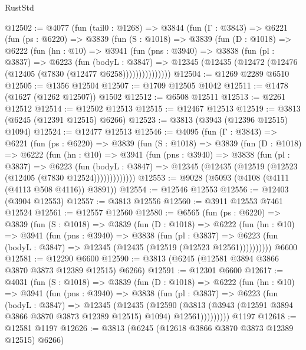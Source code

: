 \begin{lexlean}{RustStd}
\begin{coremodule}
{\begin{coremodule}
{{{{{{{{{{{{{{{{{{{{{{{{{{{{{{{{{{{@12502 := @4077
    (fun (tail0 : @1268) =>
    @3844
      (fun (Γ : @3843) =>
      @6221
        (fun (ps : @6220) =>
        @3839
          (fun (S : @1018) =>
          @3839
            (fun (D : @1018) =>
            @6222
              (fun (hn : @10) =>
              @3941
                (fun (pns : @3940) =>
                @3838
                  (fun (pl : @3837) =>
                  @6223
                    (fun (bodyL : @3847) =>
                    @12345 (@12435 (@12472 (@12476 (@12405 (@7830 (@12477 @6258)))))))))))))))
@12504 := @1269 @2289 @6510
@12505 := @1356 @12504
@12507 := @1709 @12505 @1042
@12511 := @1478 (@1627 (@1262 @12507)) @1502
@12512 := @6508 @12511
@12513 := @2261 @12512
@12514 := @12502 @12513
@12515 := @12467 @12513
@12519 := @3813 (@6245 (@12391 @12515) @6266)
@12523 := @3813 (@3943 (@12396 @12515) @1094)
@12524 := @12477 @12513
@12546 := @4095
    (fun (Γ : @3843) =>
    @6221
      (fun (ps : @6220) =>
      @3839
        (fun (S : @1018) =>
        @3839
          (fun (D : @1018) =>
          @6222
            (fun (hn : @10) =>
            @3941
              (fun (pns : @3940) =>
              @3838
                (fun (pl : @3837) =>
                @6223
                  (fun (bodyL : @3847) =>
                  @12345 (@12435 (@12519 (@12523 (@12405 (@7830 @12524)))))))))))))
@12553 := @9028 (@5093 (@4108 (@4111 (@4113 @508 @4116)) @3891))
@12554 := @12546 @12553
@12556 := @12403 (@3904 @12553)
@12557 := @3813 @12556
@12560 := @3911 @12553 @7461 @12524
@12561 := @12557 @12560
@12580 := @6565
    (fun (ps : @6220) =>
    @3839
      (fun (S : @1018) =>
      @3839
        (fun (D : @1018) =>
        @6222
          (fun (hn : @10) =>
          @3941
            (fun (pns : @3940) =>
            @3838
              (fun (pl : @3837) =>
              @6223 (fun (bodyL : @3847) => @12345 (@12435 (@12519 (@12523 @12561))))))))))
    @6600
@12581 := @12290 @6600
@12590 := @3813 (@6245 (@12581 @3894 @3866 @3870 @3873 @12389 @12515) @6266)
@12591 := @12301 @6600
@12617 := @4031
    (fun (S : @1018) =>
    @3839
      (fun (D : @1018) =>
      @6222
        (fun (hn : @10) =>
        @3941
          (fun (pns : @3940) =>
          @3838
            (fun (pl : @3837) =>
            @6223
              (fun (bodyL : @3847) =>
              @12345
                (@12435
                  (@12590
                    (@3813
                      (@3943 (@12591 @3894 @3866 @3870 @3873 @12389 @12515) @1094)
                      @12561)))))))))
    @1197
@12618 := @12581 @1197
@12626 := @3813 (@6245 (@12618 @3866 @3870 @3873 @12389 @12515) @6266)
}}}}}}}}}}}}}}}}}}}}}}}}}}}}}}}}}}}
\end{coremodule}}
\end{coremodule}
\end{lexlean}
